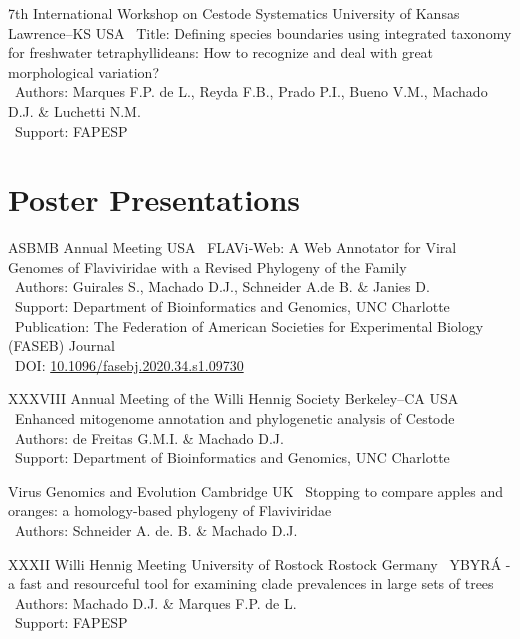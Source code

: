 \vspace{.5em}

\cventry{---}
	{7th International Workshop on Cestode Systematics}
	{University of Kansas}
	{Lawrence--KS}
	{USA}
	{
		\textbullet~Title: Defining species boundaries using integrated taxonomy for freshwater tetraphyllideans: How to recognize and deal with great morphological variation?\\
		\textbullet~Authors: Marques F.P. de L., Reyda F.B., Prado P.I., Bueno V.M., Machado D.J. \& Luchetti N.M.\\
		\textbullet~Support: FAPESP
	}


\section{Poster Presentations}

	{ASBMB Annual Meeting}
	{}
	{USA}
	{}
	{
		\textbullet~FLAVi‐Web: A Web Annotator for Viral Genomes of Flaviviridae with a Revised Phylogeny of the Family\\
		\textbullet~Authors: Guirales S.,  Machado D.J.,  Schneider A.de B. \&  Janies D.\\
		\textbullet~Support: Department of Bioinformatics and Genomics,  UNC Charlotte\\
		\textbullet~Publication: The Federation of American Societies for Experimental Biology (FASEB) Journal\\
		\textbullet~DOI: \href{https://doi.org/10.1096/fasebj.2020.34.s1.09730}{10.1096/fasebj.2020.34.s1.09730}
	}

\vspace{.5em}

	{XXXVIII Annual Meeting of the Willi Hennig Society}
	{Berkeley--CA}
	{USA}
	{}
	{
		\textbullet~Enhanced mitogenome annotation and phylogenetic analysis of Cestode\\
		\textbullet~Authors: de Freitas G.M.I. \& Machado D.J.\\
		\textbullet~Support: Department of Bioinformatics and Genomics,  UNC Charlotte
	}

\vspace{.5em}

	{Virus Genomics and Evolution}
	{Cambridge}
	{UK}
	{}
	{
		\textbullet~Stopping to compare apples and oranges: a homology-based phylogeny of Flaviviridae \\
		\textbullet~Authors: Schneider A. de. B. \& Machado D.J.
}

\vspace{.5em}

	{XXXII Willi Hennig Meeting}
	{University of Rostock}
	{Rostock}
	{Germany}
	{
		\textbullet~YBYRÁ - a fast and resourceful tool for examining clade prevalences in large sets of trees\\
		\textbullet~Authors: Machado D.J. \& Marques F.P. de L.\\
		\textbullet~Support: FAPESP
}
